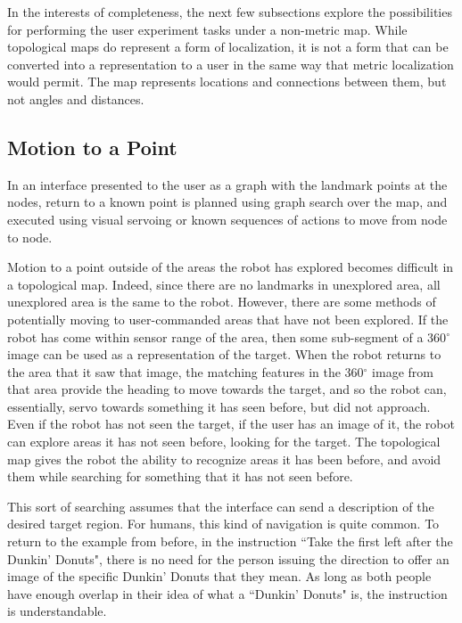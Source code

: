 In the interests of completeness, the next few subsections explore the possibilities for performing the user experiment tasks under a non-metric map. 
While topological maps do represent a form of localization, it is not a form that can be converted into a representation to a user in the same way that metric localization would permit. 
The map represents locations and connections between them, but not angles and distances. 

\subsection{Motion to a Point}

In an interface presented to the user as a graph with the landmark points at the nodes, return to a known point is planned using graph search over the map, and executed using visual servoing or known sequences of actions to move from node to node. 

Motion to a point outside of the areas the robot has explored becomes difficult in a topological map. 
Indeed, since there are no landmarks in unexplored area, all unexplored area is the same to the robot. 
However, there are some methods of potentially moving to user-commanded areas that have not been explored. 
If the robot has come within sensor range of the area, then some sub-segment of a 360$^\circ$ image can be used as a representation of the target. 
When the robot returns to the area that it saw that image, the matching features in the 360$^\circ$ image from that area provide the heading to move towards the target, and so the robot can, essentially, servo towards something it has seen before, but did not approach. 
Even if the robot has not seen the target, if the user has an image of it, the robot can explore areas it has not seen before, looking for the target.
The topological map gives the robot the ability to recognize areas it has been before, and avoid them while searching for something that it has not seen before. 

This sort of searching assumes that the interface can send a description of the desired target region. 
For humans, this kind of navigation is quite common. 
To return to the example from before, in the instruction ``Take the first left after the Dunkin' Donuts", there is no need for the person issuing the direction to offer an image of the specific Dunkin' Donuts that they mean. 
As long as both people have enough overlap in their idea of what a ``Dunkin' Donuts" is, the instruction is understandable. 

